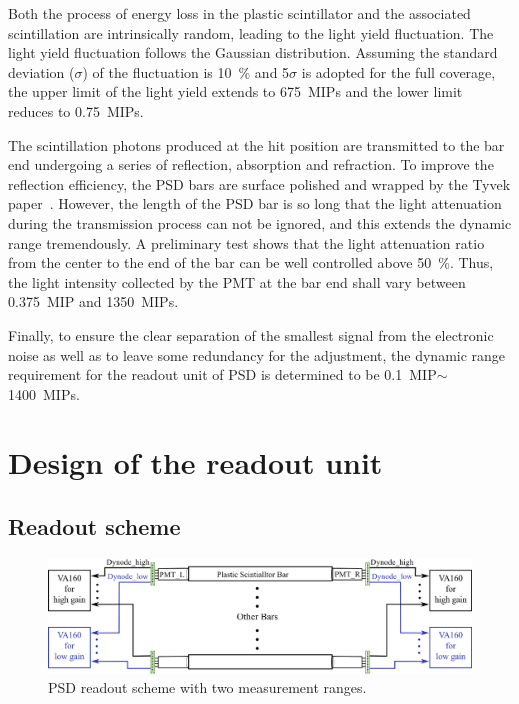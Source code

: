 \documentclass[preprint, times]{elsarticle}
\begin{document}
Both the process of energy loss in the plastic scintillator and the associated scintillation are intrinsically random, leading to the light yield fluctuation.
The light yield fluctuation follows the Gaussian distribution.
Assuming the standard deviation ($\sigma$) of the fluctuation is \SI{10}{\percent} and 5$\sigma$ is adopted for the full coverage, the upper limit of the light yield extends to \SI{675}{MIPs} and the lower limit reduces to \SI{0.75}{MIPs}.

The scintillation photons produced at the hit position are transmitted to the bar end undergoing a series of reflection, absorption and refraction.
To improve the reflection efficiency, the PSD bars are surface polished and wrapped by the Tyvek paper~\cite{tyvek}. 
However, the length of the PSD bar is so long that the light attenuation during the transmission process can not be ignored, and this extends the dynamic range tremendously.
A preliminary test shows that the light attenuation ratio from the center to the end of the bar can be well controlled above \SI{50}{\percent}. 
Thus, the light intensity collected by the PMT at the bar end shall vary between \SI{0.375}{MIP} and \SI{1350}{MIPs}.

Finally, to ensure the clear separation of the smallest signal from the electronic noise as well as to leave some redundancy for the adjustment, the dynamic range requirement for the readout unit of PSD is determined to be \SI{0.1}{MIP}$\sim$\SI{1400}{MIPs}.

\section{Design of the readout unit}
\label{sec:design}

\subsection{Readout scheme}
\label{sec:scheme}

\begin{figure}
\centering
 \includegraphics[width=140mm]{readout_scheme}
\caption{PSD readout scheme with two measurement ranges.}
\label{fig:readout_scheme}
\end{figure}
\end{document}
